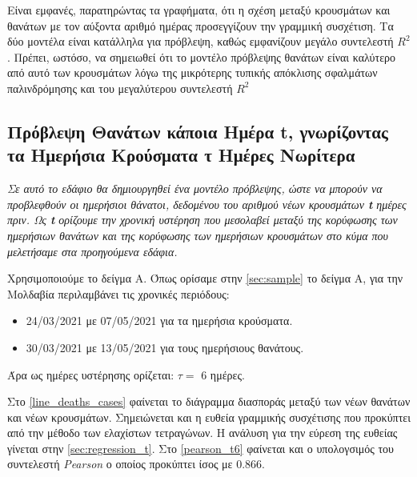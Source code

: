 \documentclass{article}
\begin{document}
Είναι εμφανές, παρατηρώντας τα γραφήματα, ότι η σχέση μεταξύ κρουσμάτων και θανάτων με τον αύξοντα αριθμό ημέρας προσεγγίζουν την γραμμική συσχέτιση. Τα δύο μοντέλα είναι κατάλληλα για πρόβλεψη, καθώς εμφανίζουν μεγάλο συντελεστή $ R^2 $. Πρέπει, ωστόσο, να σημειωθεί ότι το μοντέλο πρόβλεψης θανάτων είναι καλύτερο από αυτό των κρουσμάτων λόγω της μικρότερης τυπικής  απόκλισης  σφαλμάτων παλινδρόμησης και του μεγαλύτερου συντελεστή $ R^2 $ 

\subsection{Πρόβλεψη Θανάτων κάποια Ημέρα \foreignlanguage{english}{t}, γνωρίζοντας τα Ημερήσια Κρούσματα τ Ημέρες Νωρίτερα}

\label{sec: guess_death}

\emph{Σε αυτό το εδάφιο θα δημιουργηθεί ένα μοντέλο πρόβλεψης, ώστε να μπορούν να προβλεφθούν οι ημερήσιοι θάνατοι, δεδομένου του αριθμού νέων κρουσμάτων \textbf{t} ημέρες πριν. Ως \textbf{t} ορίζουμε την χρονική υστέρηση που μεσολαβεί μεταξύ της κορύφωσης των ημερήσιων θανάτων και της κορύφωσης των ημερήσιων κρουσμάτων στο κύμα που μελετήσαμε στα προηγούμενα εδάφια.}

Χρησιμοποιούμε το δείγμα Α. Όπως ορίσαμε στην \autoref{sec:sample} το δείγμα Α, για την Μολδαβία περιλαμβάνει τις χρονικές περιόδους:
\begin{itemize}
    \item 24/03/2021 με 07/05/2021 για τα ημερήσια κρούσματα.
    \item 30/03/2021 με 13/05/2021 για τους ημερήσιους θανάτους.
\end{itemize}

Άρα ως ημέρες υστέρησης ορίζεται: $ \tau = $ 6 ημέρες.

Στο \autoref{line_deaths_cases} φαίνεται το διάγραμμα διασποράς μεταξύ των νέων θανάτων και νέων κρουσμάτων. Σημειώνεται και η ευθεία γραμμικής συσχέτισης που προκύπτει από την μέθοδο των ελαχίστων τετραγώνων. Η ανάλυση για την εύρεση της ευθείας γίνεται στην \autoref{sec:regression_t}. Στο \autoref{pearson_t6} φαίνεται και ο υπολογσιμός του συντελεστή \emph{\foreignlanguage{english}{Pearson}} ο οποίος προκύπτει ίσος με 0.866.
\end{document}
